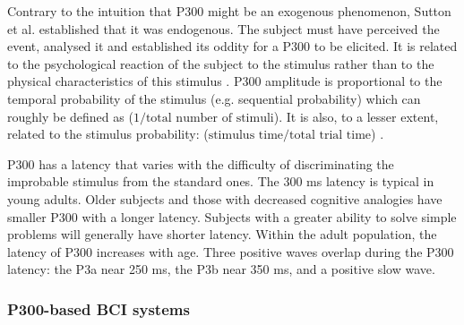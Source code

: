Contrary to the intuition that P300 might be an exogenous phenomenon, Sutton et al. established that it was endogenous. 
The subject must have perceived the event, analysed it and established its oddity for a P300 to be elicited.
It is related to the psychological reaction of the subject to the stimulus rather than to the physical characteristics of this stimulus \citep{sutton_evoked-potential_1965, sutton_information_1967}.
P300 amplitude is proportional to the temporal probability of the stimulus (e.g. sequential probability) which can roughly be defined as 
($ 1/{\text{total number of stimuli}} $).
It is also, to a lesser extent, related to the stimulus probability: ($\text{stimulus time}/{\text{total trial time}}$) \citep{fitzgerald_temporal_1967}.
\par
P300 has a latency that varies with the difficulty of discriminating the improbable stimulus from the standard ones. 
The 300 ms latency is typical in young adults. Older subjects and those with decreased cognitive analogies have smaller P300 with a longer latency. 
Subjects with a greater ability to solve simple problems will generally have shorter latency.
Within the adult population, the latency of P300 increases with age. 
Three positive waves overlap during the P300 latency: the P3a near 250 ms, the P3b near 350 ms, and a positive slow wave. 

\subsubsection{P300-based BCI systems}
\label{subsubsec:p300-bci}


